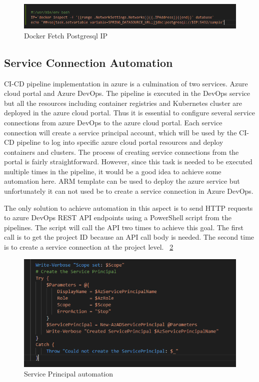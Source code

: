 \begin{figure}
    \centering
    \includegraphics[width=14cm]{images/Rahat/C1.PNG}
    \caption{Docker Fetch Postgresql IP}
    \label{fig:fetch_pgsql_IP}
\end{figure}


\subsection{Service Connection Automation}

CI-CD pipeline implementation in azure is a culmination of two services. Azure cloud portal and Azure DevOps. The pipeline is executed in the DevOps service but all the resources including container registries and Kubernetes cluster are deployed in the azure cloud portal. Thus it is essential to configure several service connections from azure DevOps to the azure cloud portal. Each service connection will create a service principal account, which will be used by the CI-CD pipeline to log into specific azure cloud portal resources and deploy containers and clusters. The process of creating service connections from the portal is fairly straightforward. However, since this task is needed to be executed multiple times in the pipeline, it would be a good idea to achieve some automation here. ARM template can be used to deploy the azure service but unfortunately it can not used be to create a service connection in Azure DevOps. 

The only solution to achieve automation in this aspect is to send HTTP requests to azure DevOps REST API endpoints using a PowerShell script from the pipelines. The script will call the API two times to achieve this goal. The first call is to get the project ID because an API call body is needed. The second time is to create a service connection at the project level. ~\ref{fig:service_principal_automation}

\begin{figure}
    \centering
    \includegraphics[width=12cm]{images/Rahat/C2.PNG}
    \caption{Service Principal automation}
    \label{fig:service_principal_automation}
\end{figure}


